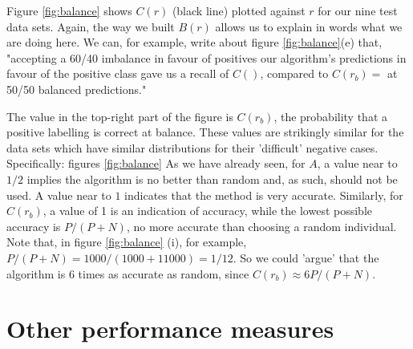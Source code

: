 \documentclass{article}
\begin{document}
Figure \ref{fig:balance} shows $C(r)$ (black line) plotted against $r$ for our nine test data sets. Again, the way we built $B(r)$ allows us to explain in words what we are doing here. We can, for example, write about figure \ref{fig:balance}(e) that, "accepting a 60/40 imbalance in favour of positives our algorithm's predictions in favour of the positive class gave us a recall of $C()$, compared to $C(r_b)=$ at 50/50 balanced predictions." 

 The value in the top-right part of the figure is $C(r_b)$, the probability that a positive labelling is correct at balance. These values are strikingly similar for the data sets which have similar distributions for their 'difficult' negative cases. Specifically: figures \ref{fig:balance} 
As we have already seen, for $A$, a value near to $1/2$ implies the algorithm is no better than random and, as such, should not be used. A value near to $1$ indicates that the method is very accurate. Similarly, for $C(r_b)$, a value of 1 is an indication of accuracy, while the lowest possible accuracy is $P/(P+N)$, no more accurate than choosing a random individual. Note that, in figure \ref{fig:balance} (i), for example,  $P/(P+N)=1000/(1000+11000)=1/12$. So we could 'argue' that the algorithm is 6 times as accurate as random, since $C(r_b) \approx 6 P/(P+N)$. 



\section{Other performance measures}
\end{document}
